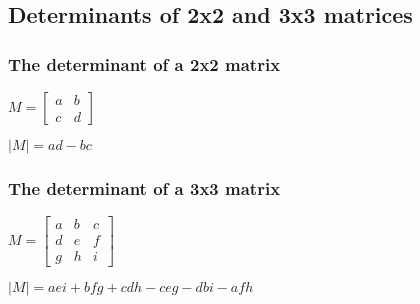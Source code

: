 
\subsection{Determinants of 2x2 and 3x3 matrices}

\subsubsection{The determinant of a 2x2 matrix}

$M=\begin{bmatrix}a & b\\c & d\end{bmatrix}$

\(|M|=ad-bc\)

\subsubsection{The determinant of a 3x3 matrix}

$M=\begin{bmatrix}a & b & c\\d & e & f\\g & h & i\end{bmatrix}$

\(|M|=aei+bfg+cdh-ceg-dbi-afh\)

